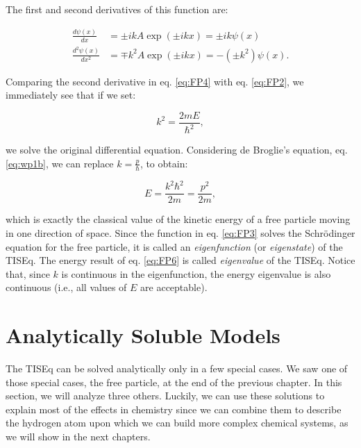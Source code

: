 \documentclass[
  9pt,
]{extbook}
\theoremstyle{definition}
\theoremstyle{definition}
\theoremstyle{definition}
\theoremstyle{remark}
\begin{document}
The first and second derivatives of this function are:

\begin{equation}
\begin{aligned}
\frac{d \psi(x)}{dx} &= \pm ik A \exp(\pm ikx) = \pm ik \psi(x) \\
\frac{d^2 \psi(x)}{dx^2} &= \mp k^2  A \exp(\pm ikx) = -(\pm k^2) \psi(x). 
\end{aligned}
\label{eq:FP4}
\end{equation}

Comparing the second derivative in eq. \eqref{eq:FP4} with eq. \eqref{eq:FP2}, we immediately see that if we set:

\begin{equation}
k^2 = \frac{2mE}{\hbar^2},
\label{eq:FP5}
\end{equation}

we solve the original differential equation. Considering de Broglie's equation, eq. \eqref{eq:wp1b}, we can replace \(k=\frac{p}{\hbar}\), to obtain:

\begin{equation}
E = \frac{k^2 \hbar^2}{2m} = \frac{p^2}{2m},
\label{eq:FP6}
\end{equation}

which is exactly the classical value of the kinetic energy of a free particle moving in one direction of space. Since the function in eq. \eqref{eq:FP3} solves the Schrödinger equation for the free particle, it is called an \emph{eigenfunction} (or \emph{eigenstate}) of the TISEq. The energy result of eq. \eqref{eq:FP6} is called \emph{eigenvalue} of the TISEq. Notice that, since \(k\) is continuous in the eigenfunction, the energy eigenvalue is also continuous (i.e., all values of \(E\) are acceptable).

\hypertarget{Models}{%
\chapter{Analytically Soluble Models}\label{Models}}

The TISEq can be solved analytically only in a few special cases. We saw one of those special cases, the free particle, at the end of the previous chapter. In this section, we will analyze three others. Luckily, we can use these solutions to explain most of the effects in chemistry since we can combine them to describe the hydrogen atom upon which we can build more complex chemical systems, as we will show in the next chapters.
\end{document}
